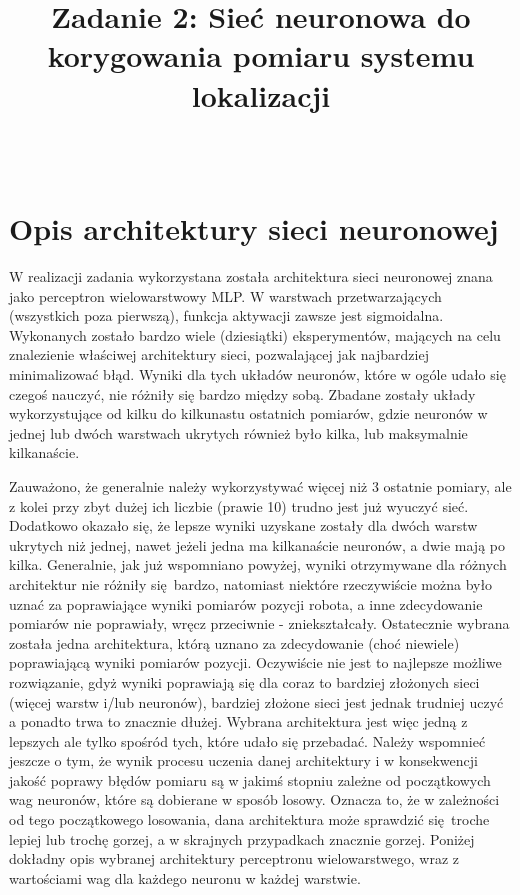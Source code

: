 \documentclass{classrep}
\author{%
    \studentinfo{Jan Karwowski}{216793}\\
    \studentinfo{Kamil Kowalewski}{216806}%
}
\title{Zadanie 2: Sieć neuronowa do korygowania pomiaru systemu lokalizacji}
\begin{document}
    \maketitle
    \thispagestyle{fancyplain}

    \section{Opis architektury sieci neuronowej} {

        W realizacji zadania wykorzystana została architektura sieci neuronowej znana jako
        perceptron wielowarstwowy MLP. W warstwach przetwarzających (wszystkich poza pierwszą),
        funkcja aktywacji zawsze jest sigmoidalna. Wykonanych zostało bardzo wiele (dziesiątki)
        eksperymentów, mających na celu znalezienie właściwej architektury sieci, pozwalającej jak
        najbardziej minimalizować błąd. Wyniki dla tych układów neuronów, które w ogóle udało się
        czegoś nauczyć, nie różniły się bardzo między sobą. Zbadane zostały układy wykorzystujące od
        kilku do kilkunastu ostatnich pomiarów, gdzie neuronów w jednej lub dwóch warstwach ukrytych
        również było kilka, lub maksymalnie kilkanaście.

        Zauważono, że generalnie należy wykorzystywać więcej niż 3 ostatnie pomiary, ale z kolei
        przy zbyt dużej ich liczbie (prawie 10) trudno jest już wyuczyć sieć. Dodatkowo okazało się,
        że lepsze wyniki uzyskane zostały dla dwóch warstw ukrytych niż jednej, nawet jeżeli jedna
        ma kilkanaście neuronów, a dwie mają po kilka. Generalnie, jak już wspomniano powyżej,
        wyniki otrzymywane dla różnych architektur nie różniły się bardzo, natomiast niektóre
        rzeczywiście można było uznać za poprawiające wyniki pomiarów pozycji robota, a inne
        zdecydowanie pomiarów nie poprawiały, wręcz przeciwnie - zniekształcały. Ostatecznie wybrana
        została jedna architektura, którą uznano za zdecydowanie (choć niewiele) poprawiającą wyniki
        pomiarów pozycji. Oczywiście nie jest to najlepsze możliwe rozwiązanie, gdyż wyniki
        poprawiają się dla coraz to bardziej złożonych sieci (więcej warstw i/lub neuronów),
        bardziej złożone sieci jest jednak trudniej uczyć a ponadto trwa to znacznie dłużej. Wybrana
        architektura jest więc jedną z lepszych ale tylko spośród tych, które udało się przebadać.
        Należy wspomnieć jeszcze o tym, że wynik procesu uczenia danej architektury i w konsekwencji
        jakość poprawy błędów pomiaru są w jakimś stopniu zależne od początkowych wag neuronów,
        które są dobierane w sposób losowy.  Oznacza to, że w zależności od tego początkowego
        losowania, dana architektura może sprawdzić się troche lepiej lub trochę gorzej, a w
        skrajnych przypadkach znacznie gorzej.  Poniżej dokładny opis wybranej architektury
        perceptronu wielowarstwego, wraz z wartościami wag dla każdego neuronu w każdej warstwie.

}
\end{document}
